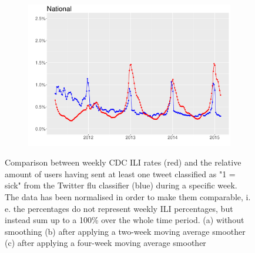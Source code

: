 \documentclass[11pt, a4paper]{article}\usepackage[]{graphicx}\usepackage[]{color}
\begin{document}
\begin{figure}[h]
  \begin{subfigure}[t]{0.6\textwidth}
  \includegraphics[width=1\linewidth,height=0.5\linewidth]{cdc_twitter_comp_nat_ma4_user.pdf}
  \caption{}
  \label{cdc_tw_comp_nat_ma4_user}
  \end{subfigure}
  \caption{Comparison between weekly CDC ILI rates (red) and the relative amount of users having sent at least one tweet classified as "1 = sick" from the Twitter flu classifier (blue) during a specific week. The data has been normalised in order to make them comparable, i. e. the percentages do not represent weekly ILI percentages, but instead sum up to a 100\% over the whole time period. (a) without smoothing (b) after applying a two-week moving average smoother (c) after applying a four-week moving average smoother}
\end{figure}
\end{document}

